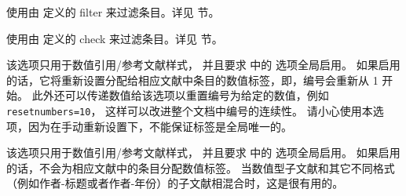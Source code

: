 \begin{optionlist*}

使用由  定义的 filter  来过滤条目。详见  节。



使用由  定义的 check  来过滤条目。详见   节。



该选项只用于数值引用/参考文献样式，
并且要求  中的  选项全局启用。
如果启用的话，它将重新设置分配给相应文献中条目的数值标签，即，编号会重新从 1 开始。
此外还可以传递数值给该选项以重置编号为给定的数值，例如 \texttt{resetnumbers=10}，
这样可以改进整个文档中编号的连续性。
请小心使用本选项，因为在手动重新设置下，\biblatex 不能保证标签是全局唯一的。



该选项只用于数值引用/参考文献样式，
并且要求  中的  选项全局启用。
如果启用的话，\biblatex 不会为相应文献中的条目分配数值标签。
当数值型子文献和其它不同格式（例如作者-标题或者作者-年份）的子文献相混合时，这是很有用的。

\end{optionlist*}

